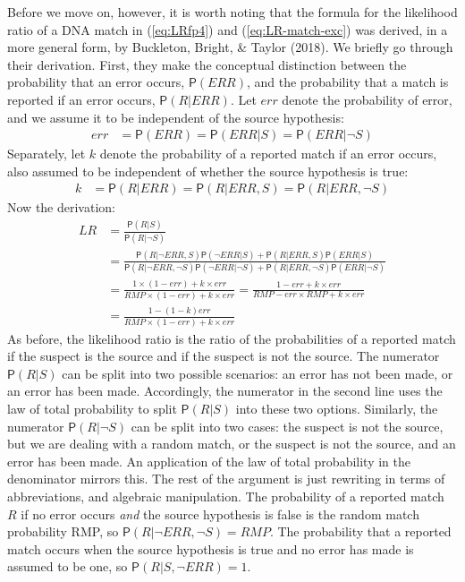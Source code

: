 \documentclass[
  10pt,
  dvipsnames,enabledeprecatedfontcommands]{scrartcl}
\newcommand{\n}{\neg}
\newcommand{\pr}[1]{\mathsf{P}(#1)}
\begin{document}
Before we move on, however, it is worth noting that the formula for the
likelihood ratio of a DNA match in (\ref{eq:LRfp4}) and
(\ref{eq:LR-match-exc}) was derived, in a more general form, by
Buckleton, Bright, \& Taylor (2018). We briefly go through their
derivation. First, they make the conceptual distinction between the
probability that an error occurs, \(\pr{ERR}\), and the probability that
a match is reported if an error occurs, \(\pr{R \vert ERR}\). Let
\(err\) denote the probability of error, and we assume it to be
independent of the source hypothesis:\\
\begin{align*}
err & = \pr{ERR} = \pr{ERR \vert S} = \pr{ERR \vert \n S}
\end{align*} \noindent  Separately, let \(k\) denote the probability of
a reported match if an error occurs, also assumed to be independent of
whether the source hypothesis is true: \begin{align*}
k & = \pr{R \vert ERR} = \pr{R \vert ERR, S} = \pr{R \vert ERR, \n S}
\end{align*} \noindent  Now the derivation: \begin{align*}
LR & = \frac{\pr{R\vert S}}
{\pr{R \vert \n S}}\\
& = \frac{\pr{R \vert \n ERR, S}\pr{\n ERR \vert S} + \pr{R \vert ERR, S}\pr{ERR \vert S}}
{\pr{R \vert \n ERR, \n S}\pr {\n ERR \vert \n S} + \pr{R \vert ERR, \n S}\pr{ERR \vert \n S}}\\
& = \frac{1\times (1-err) + k\times err}
{RMP\times (1-err)+k\times err}  = \frac{1-err+k\times err}{RMP  - err\times RMP + k \times err} \\
& = \frac{1 - (1-k)err}{RMP\times (1-err)+k\times err}
\end{align*} \noindent As before, the likelihood ratio is the ratio of
the probabilities of a reported match if the suspect is the source and
if the suspect is not the source. The numerator \(\pr{R\vert S}\) can be
split into two possible scenarios: an error has not been made, or an
error has been made. Accordingly, the numerator in the second line uses
the law of total probability to split \(\pr{R\vert S}\) into these two
options. Similarly, the numerator \(\pr{R\vert \n S}\) can be split into
two cases: the suspect is not the source, but we are dealing with a
random match, or the suspect is not the source, and an error has been
made. An application of the law of total probability in the denominator
mirrors this. The rest of the argument is just rewriting in terms of
abbreviations, and algebraic manipulation. The probability of a reported
match \(R\) if no error occurs \textit{and} the source hypothesis is
false is the random match probability RMP, so
\(\pr{R \vert \n ERR, \n S}=RMP\). The probability that a reported match
occurs when the source hypothesis is true and no error has made is
assumed to be one, so \(\pr{R \vert S, \n ERR} =1\).
\end{document}
